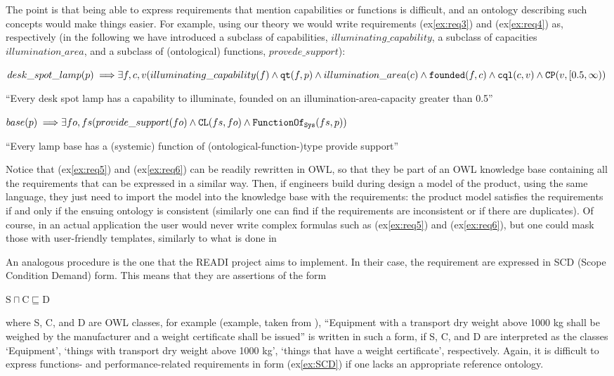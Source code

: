 \documentclass[sw]{iosart2x}
\newcommand{\bflist}{\begin{list}{}{\setlength{\topsep}{2mm}\setlength{\partopsep}{0mm}\setlength{\parsep}{0mm}\setlength{\leftmargin}{9mm}\setlength{\labelwidth}{8mm}}}
\newcommand{\eflist}{\end{list}}
\newcommand{\ExLabel}{\textrm{ex}}
\newcommand{\myex}[1]{\refstepcounter{cntex}\begin{small}{\bf \ExLabel\thecntex\label{ex:#1}}\end{small}}
\newcounter{cntex}
\newcommand{\mytext}[1]{``#1''}
\newcommand{\refex}[1]{({\ExLabel}\ref{#1})}
\newcommand{\generalStyle}[1]{\texttt{#1}}
\newcommand{\biRel}[3]{\generalStyle{#1}(#2,#3)}
\newcommand{\biRelPar}[4]{\generalStyle{#1}_{\generalStyle{#4}}(#2,#3)}
\newcommand{\myfi}{\hspace{0.9mm} \Longrightarrow}
\newcommand{\OWL}{\textnormal{OWL}\xspace}
\newcommand{\DOLCEPartBin}[2]{\biRel{{CP}}{#1}{#2}}
\newcommand{\DOLCEQualityDirect}[2]{\biRel{qt}{#1}{#2}}
\newcommand{\DOLCEQualeDirect}[2]{\biRel{{cql}}{#1}{#2}}
\newcommand{\DOLCECLbyBinary}[2]{\biRel{CL}{#1}{#2}}
\newcommand{\FunctionSysOf}[2]{\biRelPar{FunctionOf}{#1}{#2}{Sys}}
\newcommand{\founded}[2]{\biRel{\foundedTerm{passive}}{#1}{#2}}
\newcommand{\foundedTerm}[1]{%
  \ifthenelse{\equal{#1}{passive}}{founded}{%
    \ifthenelse{\equal{#1}{verb}}{found}{%
      \ifthenelse{\equal{#1}{gerund}}{founding}{%
        ERROR!%
      }%
    }%
  }%
}
\newcommand{\quotes}[1]{`#1'}
\newcommand{\qquotes}[1]{``#1''}
\begin{document}
{The point is that being able to express requirements that mention capabilities or functions is difficult, and an ontology describing such concepts would make things easier.
For example, using our theory we would write requirements \refex{ex:req3} and \refex{ex:req4} as, respectively (in the following we have introduced a subclass of capabilities, $illuminating\_capability$, a subclass of capacities $illumination\_area$, and a subclass of (ontological) functions, $provede\_support$):
\bflist
  \item[\myex{req5}] $ desk\_spot\_lamp(p) \myfi \exists f,c,v( illuminating\_capability(f) \land \DOLCEQualityDirect{f}{p} \land illumination\_area(c) \land \\ \founded{f}{c} \land \DOLCEQualeDirect{c}{v} \land \DOLCEPartBin{v}{[0.5, \infty)}$
  \item[] \mytext{Every desk spot lamp has a capability to illuminate, founded on an illumination-area-capacity greater than 0.5} 
  \item[\myex{req6}] $ base(p) \myfi \exists fo,fs (provide\_support(fo) \land \DOLCECLbyBinary{fs}{fo} \land \FunctionSysOf{fs}{p})$
  \item[] \mytext{Every lamp base has a (systemic) function of (ontological-function-)type provide support} 
\eflist
Notice that \refex{ex:req5} and \refex{ex:req6} can be readily rewritten in \OWL, so that they be part of an \OWL knowledge base containing all the requirements that can be expressed in a similar way. 
Then, if engineers build during design a model of the product, using the same language, they just need to import the model into the knowledge base with the requirements: the product model satisfies the requirements if and only if the ensuing ontology is consistent (similarly one can find if the requirements are inconsistent or if there are duplicates).  
Of course, in an actual application the user would never write complex formulas such as \refex{ex:req5} and \refex{ex:req6}, but one could mask those with user-friendly templates, similarly to what is done in \cite{chenOntologybasedRequirementVerification2020}  

An analogous procedure is the one that the READI project \cite{overliAssetInformationModelling2021,kluwerOntologybasedRequirementsManagement2018} aims to implement. 
In their case, the requirement are expressed in SCD (Scope Condition Demand) form.
This means that they are assertions of the form
\bflist
  \item[\myex{SCD}] $ \text{S} \sqcap \text{C} \sqsubseteq \text{D}  $
\eflist
where S, C, and D are \OWL classes, for example (example, taken from \cite{overliAssetInformationModelling2021}), \qquotes{Equipment with a transport dry weight above 1000 kg shall be weighed by the manufacturer and a weight certificate shall be issued} is written in such a form, if S, C, and D are interpreted as the classes \quotes{Equipment}, \quotes{things with transport dry weight above 1000 kg}, \quotes{things that have a weight certificate}, respectively.   
Again, it is difficult to express functions- and performance-related requirements in form \refex{ex:SCD} if one lacks an appropriate reference ontology. 

}
\end{document}
